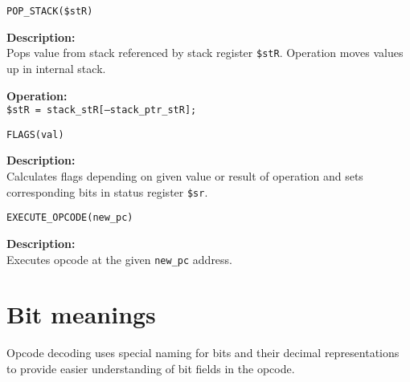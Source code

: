 \documentclass[oneside,english,a4paper,10pt,oneside,openany,final]{memoir}
\newcommand{\Code}[1]{\texttt{#1}}
\newcommand{\Function}[1]{\texttt{#1}}
\newcommand{\Register}[1]{\texttt{#1}}
\newcommand{\Variable}[1]{\texttt{#1}}
\begin{document}
\begin{description}
  \item \Function{POP\_STACK(\$stR)}
  \begin{description}
	\item \textbf{Description:} \\ 
      Pops value from stack referenced by stack register \Register{\$stR}. Operation moves values up in internal stack.

    \item \textbf{Operation:} \\
      \Code{\$stR = stack\_stR[--stack\_ptr\_stR];}
  \end{description}
\end{description}

\begin{description}
  \item \Function{FLAGS(val)}
  \begin{description}
    \item\textbf{Description:} \\
      Calculates flags depending on given value or result of operation and sets corresponding bits in status register \Register{\$sr}.
  \end{description}
\end{description}

\begin{description}
  \item \Function{EXECUTE\_OPCODE(new\_pc)}
  \begin{description}
    \item \textbf{Description:} \\
      Executes opcode at the given \Variable{new\_pc} address.
  \end{description}
\end{description}

\pagebreak{}

\section{Bit meanings}

Opcode decoding uses special naming for bits and their decimal representations to provide easier understanding of bit fields in the opcode.
\end{document}
